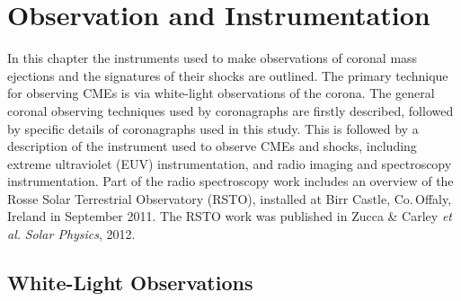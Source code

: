 
\singlespacing
\chapter{Observation and Instrumentation} 
\label{chap:3}
\doublespacing
In this chapter the instruments used to make observations of coronal mass ejections and the signatures of their shocks are outlined. The primary technique for observing CMEs is via white-light observations of the corona. The general coronal observing techniques used by coronagraphs are firstly described, followed by specific details of coronagraphs used in this study. This is followed by a description of the instrument used to observe CMEs and shocks, including extreme ultraviolet (EUV) instrumentation, and radio imaging and spectroscopy instrumentation. Part of the radio spectroscopy work includes an overview of the Rosse Solar Terrestrial Observatory (RSTO), installed at Birr Castle, Co.\,Offaly, Ireland in September 2011. The RSTO work was published in Zucca \& Carley {\it et al.} {\it Solar Physics}, 2012.
\clearpage

\section{White-Light Observations}\label{sec:1}

